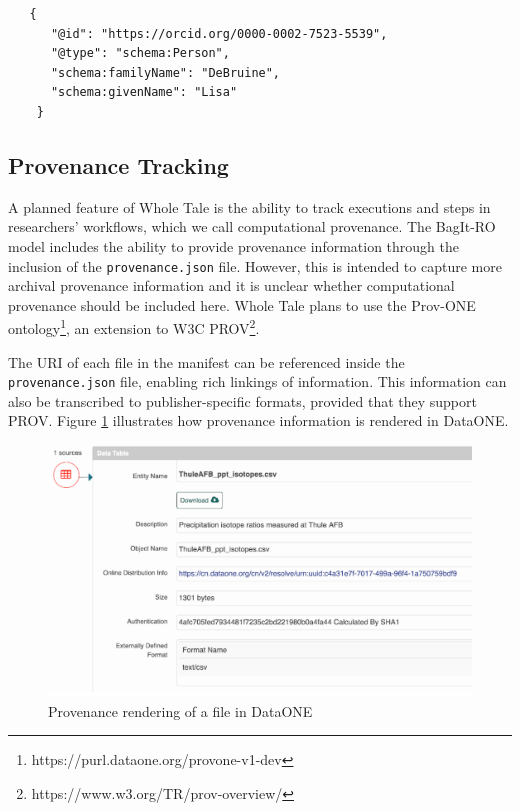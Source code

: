 \documentclass[conference]{IEEEtran}
\begin{document}
\begin{lstlisting}
   {
      "@id": "https://orcid.org/0000-0002-7523-5539",
      "@type": "schema:Person",
      "schema:familyName": "DeBruine",
      "schema:givenName": "Lisa"
    }
\end{lstlisting}
		
		
\subsection{Provenance Tracking}

A planned feature of Whole Tale is the ability to track executions and steps in researchers' workflows, which we call computational provenance. The BagIt-RO model includes the ability to provide provenance information through the inclusion of the \texttt{provenance.json} file. However, this is intended to capture more archival provenance information and it is unclear whether computational provenance should be included here. Whole Tale plans to use the Prov-ONE ontology\footnote{https://purl.dataone.org/provone-v1-dev}, an extension to W3C PROV\footnote{https://www.w3.org/TR/prov-overview/}.

The URI of each file in the manifest can be referenced inside the \texttt{provenance.json} file, enabling rich linkings of information. This information can also be transcribed to publisher-specific formats, provided that they support PROV. Figure \ref{prov-fig} illustrates how provenance information is rendered in DataONE.

\begin{figure}
\centering
\includegraphics[scale=0.4]{images/dataone-prov.png}
\caption{Provenance rendering of a file in DataONE}
\label{prov-fig}
\end{figure}
\end{document}
